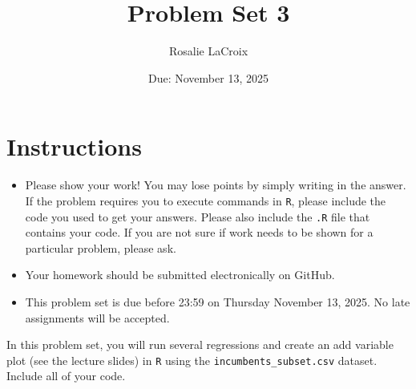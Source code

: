 \documentclass[12pt,letterpaper]{article}
\title{Problem Set 3}
\date{Due: November 13, 2025}
\author{Rosalie LaCroix}
\begin{document}
	\maketitle
	\section*{Instructions}
	\begin{itemize}
		\item Please show your work! You may lose points by simply writing in the answer. If the problem requires you to execute commands in \texttt{R}, please include the code you used to get your answers. Please also include the \texttt{.R} file that contains your code. If you are not sure if work needs to be shown for a particular problem, please ask.
	\item Your homework should be submitted electronically on GitHub.
	\item This problem set is due before 23:59 on Thursday November 13, 2025. No late assignments will be accepted.

	\end{itemize}

		\vspace{.25cm}
	
\noindent In this problem set, you will run several regressions and create an add variable plot (see the lecture slides) in \texttt{R} using the \texttt{incumbents\_subset.csv} dataset. Include all of your code.

	\vspace{.5cm}
\end{document}
